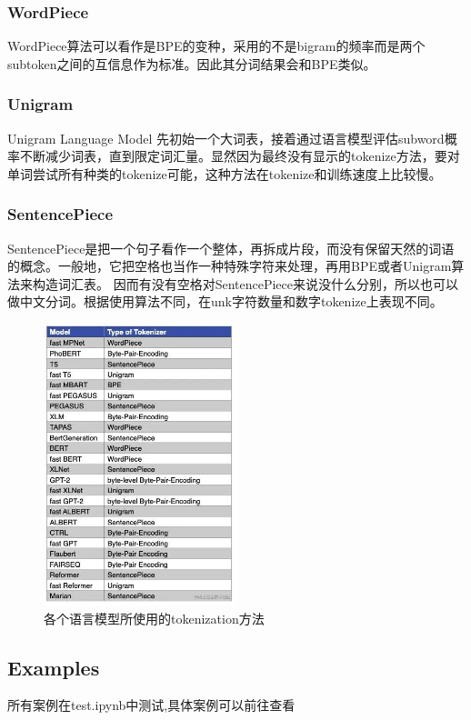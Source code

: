 \documentclass[12pt,letterpaper]{article}
\begin{document}
\subsubsection{WordPiece}

WordPiece算法可以看作是BPE的变种，采用的不是bigram的频率而是两个subtoken之间的互信息作为标准。因此其分词结果会和BPE类似。

\subsubsection{Unigram}

Unigram Language Model 先初始一个大词表，接着通过语言模型评估subword概率不断减少词表，直到限定词汇量。显然因为最终没有显示的tokenize方法，要对单词尝试所有种类的tokenize可能，这种方法在tokenize和训练速度上比较慢。
\subsubsection{SentencePiece}

SentencePiece是把一个句子看作一个整体，再拆成片段，而没有保留天然的词语的概念。一般地，它把空格也当作一种特殊字符来处理，再用BPE或者Unigram算法来构造词汇表。
因而有没有空格对SentencePiece来说没什么分别，所以也可以做中文分词。根据使用算法不同，在unk字符数量和数字tokenize上表现不同。

\begin{figure}[h]
  \centering
  \includegraphics[width=0.5\textwidth]{tokenizers.png}
  \caption{各个语言模型所使用的tokenization方法}
  \label{fig:example}
\end{figure}


\subsection{Examples}
所有案例在test.ipynb中测试,具体案例可以前往查看
\end{document}
